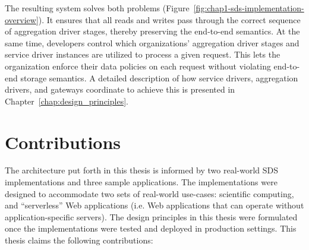 The resulting system solves both problems
(Figure~\ref{fig:chap1-sds-implementation-overview}).
It ensures that all reads and writes pass through the
correct sequence of aggregation driver
stages, thereby preserving the end-to-end semantics.  At the same time, developers 
control which organizations' aggregation driver stages and service driver
instances are utilized to process a given request.  This lets the organization
enforce their data policies on each request without violating end-to-end
storage semantics.  A detailed description of how service drivers, aggregation
drivers, and gateways coordinate to achieve this is presented in
Chapter~\ref{chap:design_principles}.

\section{Contributions}

The architecture put forth in this thesis is informed by two real-world SDS
implementations and three sample applications.  The implementations were 
designed to accommodate two sets of real-world use-cases: scientific computing,
and ``serverless'' Web applications (i.e. Web applications that can operate
without application-specific servers).
The design principles in this thesis 
were formulated once the implementations were tested and
deployed in production settings.  This thesis claims the following contributions:


